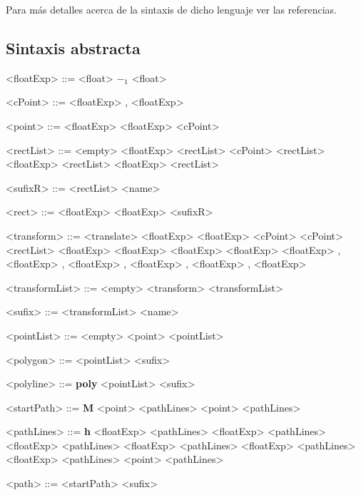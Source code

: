 \documentclass[a4paper,10pt]{article}
\begin{document}
    Para más detalles acerca de la sintaxis de dicho lenguaje ver las referencias.

\subsection*{Sintaxis abstracta}

\begin{grammar}
<floatExp> ::= <float>
    \alt $-_{1}$ <float>

<cPoint> ::= <floatExp> , <floatExp>

<point> ::= <floatExp> <floatExp>
    \alt <cPoint>

<rectList> ::= <empty>
     <floatExp> <rectList>
     <cPoint> <rectList>
     <floatExp> <rectList>
     <floatExp> <rectList>

<sufixR> ::= <rectList> <name>

<rect> ::= <floatExp> <floatExp> <sufixR>

<transform> ::= <translate> <floatExp>
     <floatExp> <cPoint>
     <cPoint> <rectList>
     <floatExp>
     <floatExp>
     <floatExp>
     <floatExp>
     <floatExp> , <floatExp> , <floatExp> , <floatExp> , <floatExp> , <floatExp>

<transformList> ::= <empty>
    \alt <transform> <transformList>

<sufix> ::= <transformList> <name>

<pointList> ::= <empty>
    \alt <point> <pointList>

<polygon> ::= <pointList> <sufix>

<polyline> ::= {\bfseries poly} <pointList> <sufix>

<startPath> ::= {\bfseries M} <point> <pathLines>
     <point> <pathLines>

<pathLines> ::= {\bfseries h} <floatExp> <pathLines>
     <floatExp> <pathLines>
     <floatExp> <pathLines>
     <floatExp> <pathLines>
     <floatExp> <pathLines>
     <floatExp> <pathLines>
    \alt <point> <pathLines>

<path> ::= <startPath> <sufix>
\end{grammar}
\end{document}
